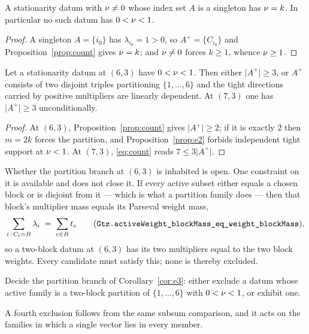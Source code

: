\begin{corollary}[Lean]\label{cor:singleactive}
A stationarity datum with $\nu\ne0$ whose index set $A$ is a singleton has
$\nu=k$.  In particular no such datum has $0<\nu<1$.
\end{corollary}

\begin{proof}
A singleton $A=\{i_0\}$ has $\lambda_{i_0}=1>0$, so $A^{+}=\{C_{i_0}\}$
and Proposition~\ref{prop:count} gives $\nu=k$; and $\nu\ne0$ forces $k\ge1$,
whence $\nu\ge1$.
\end{proof}

\begin{corollary}[Lean]\label{cor:e3}
Let a stationarity datum at $(6,3)$ have $0<\nu<1$.  Then either
$\lvert A^{+}\rvert\ge3$, or $A^{+}$ consists of two disjoint triples
partitioning $\{1,\dots,6\}$ and the tight directions carried by positive
multipliers are linearly dependent.  At $(7,3)$ one has
$\lvert A^{+}\rvert\ge3$ unconditionally.
\end{corollary}

\begin{proof}
At $(6,3)$, Proposition~\ref{prop:count} gives
$\lvert A^{+}\rvert\ge2$; if it is exactly $2$ then $m=2k$ forces the
partition, and Proposition~\ref{prop:e2} forbids independent tight
support at $\nu<1$.  At $(7,3)$, \eqref{eq:count} reads
$7\le3\lvert A^{+}\rvert$.
\end{proof}

Whether the partition branch at $(6,3)$ is inhabited is open.  One
constraint on it is available and does not close it.  If every active
subset either equals a chosen block or is disjoint from it --- which is
what a partition family does --- then that block's multiplier mass equals
its Parseval weight mass,
\[
  \sum_{i\,:\,C_i=B}\lambda_i\;=\;\sum_{c\in B}t_c
  \qquad\text{(\texttt{Gtz.active\allowbreak Weight\_block\allowbreak Mass\_eq\_weight\_block\allowbreak Mass})},
\]
so a two-block datum at $(6,3)$ has its two multipliers equal to the two
block weights.  Every candidate must satisfy this; none is thereby
excluded.

\begin{wip}
Decide the partition branch of Corollary~\ref{cor:e3}: either exclude a
datum whose active family is a two-block partition of $\{1,\dots,6\}$
with $0<\nu<1$, or exhibit one.
\end{wip}

A fourth exclusion follows from the same subsum comparison, and it acts
on the families in which a single vector lies in every member.

